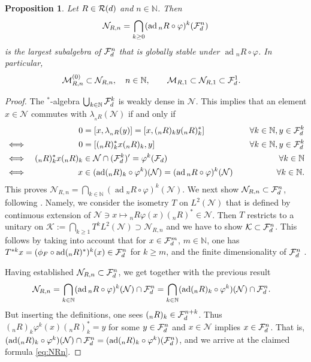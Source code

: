 \documentclass[12pt,a4paper]{amsart}
\numberwithin{equation}{section}
\newtheorem{proposition}[theorem]{Proposition}
\theoremstyle{remark}
\DeclareMathOperator{\ad}{ad}
\newcommand{\Nl}{\mathbb{N}}
\newcommand{\la}{\lambda}
\newcommand{\CK}[0]{\mathcal{K}} \newcommand{\CL}[0]{\mathcal{L}}
\newcommand{\CM}[0]{\mathcal{M}} \newcommand{\CN}[0]{\mathcal{N}}
\begin{document}
\begin{proposition}
 Let $R\in\mathcal{R}(d)$ and $n\in\Nl$. Then 
 \begin{align}\label{eq:NRn}
  \CN_{R,n}
  =
  \bigcap_{k\geq0}(\ad {}_nR\circ\varphi)^k(\CF_d^n)
 \end{align}
 is the largest subalgebra of $\mathcal{F}_d^n$ that is globally stable under $\ad{}_nR\circ\varphi$. In particular, 
 \begin{align}
  \CM_{R,n}^{(0)}
  &\subset\CN_{R,n},\quad n\in\Nl,
  \qquad
  \CM_{R,1}
  \subset\CN_{R,1}
  \subset\CF_d^1
  .
  \label{eq:MR1inNR1}
 \end{align}
\end{proposition}
\begin{proof}
The ${}^*$-algebra $\bigcup_{k\in\Nl}\CF_d^k$ is weakly dense in $\CN$. This implies that an element $x\in\CN$ commutes with $\la_{{}_nR}(\CN)$ if and only if
 \begin{alignat*}{5}
  &&0&=[x,\la_{{}_nR}(y)]
  =[x,({}_nR)_ky({}_nR)_k^*] 
  &\quad\forall k\in\Nl,y\in\CF_d^k
  \\
  &\Longleftrightarrow&\;
  0&=[({}_nR)_k^*x({}_nR)_k,y]
  &\quad\forall k\in\Nl,y\in\CF_d^k
  \\
  &\Longleftrightarrow&\;
  ({}_nR)_k^*x({}_nR)_k&\in\CN\cap(\CF_d^k)'=\varphi^k(\CF_d)
  &\quad\forall k\in\Nl\\
  &\Longleftrightarrow&\;
  x&\in(\ad ({}_nR)_k\circ\varphi^k)(\CN)=(\ad{}_nR\circ \varphi)^k(\CN)
  &\quad\forall k\in\Nl.
 \end{alignat*}
 This proves $\CN_{R,n}=\bigcap_{k\in\Nl}(\ad {}_nR\circ\varphi)^k(\CN)$. We next show $\CN_{R,n}\subset\CF_d^n$, following \cite[Thm.~3.16]{Akemann:1997}. Namely, we consider the isometry $T$ on $L^2(\CN)$ that is defined by continuous extension of $\CN\ni x\mapsto {}_nR\varphi(x)({}_nR)^*\in\CN$. Then $T$ restricts to a unitary on $\CK:=\bigcap_{k\geq1}T^kL^2(\CN)\supset\CN_{R,n}$ and we have to show $\CK\subset\CF_d^n$. This follows by taking into account that for $x\in\mathcal{F}_d^m$, $m\in\Nl$, one has $T^{*k}x=(\phi_F\circ\ad({}_nR)^*)^k(x)\in\CF_d^n$ for $k\geq m$, and the finite dimensionality of $\mathcal{F}_d^n$ \cite[Lemma~3.15]{Akemann:1997}.
 
 Having established $\CN_{R,n}\subset\CF_d^n$, we get together with the previous result
 \begin{align*}
  \CN_{R,n}
  &=\bigcap_{k\in\Nl}(\ad {}_nR\circ\varphi)^k(\CN)\cap\CF_d^n
  =\bigcap_{k\in\Nl}(\ad ({}_nR)_k\circ\varphi^k)(\CN)\cap\CF_d^n.
 \end{align*}
 But inserting the definitions, one sees $({}_nR)_k\in\mathcal{F}_d^{n+k}$. Thus $({}_nR)_k\varphi^k(x)({}_nR)_k^*=y$ for some $y\in\mathcal{F}_d^n$ and $x\in\CN$ implies $x\in\mathcal{F}_d^n$. That is, $(\ad ({}_nR)_k\circ\varphi^k)(\CN)\cap\CF_d^n=(\ad ({}_nR)_k\circ\varphi^k)(\CF_d^n)$, and we arrive at the claimed formula \eqref{eq:NRn}.
 

\end{proof}
\end{document}
